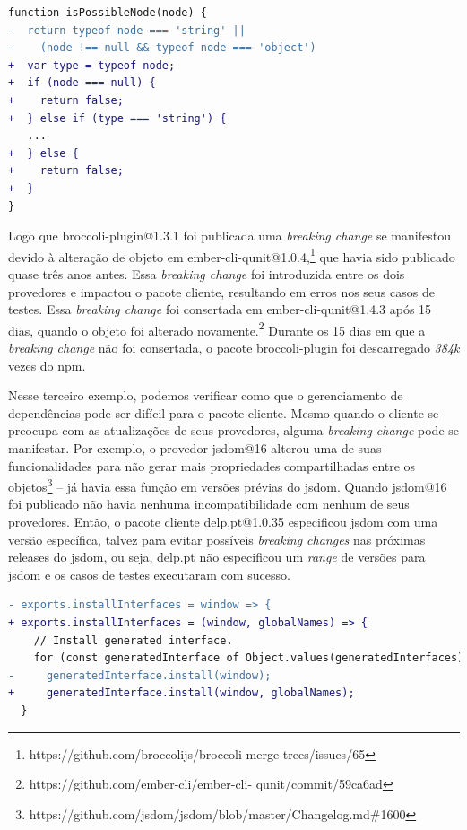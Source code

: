 \vspace{0.4cm}
\begin{lstlisting}[numbers=none, language=diff, label=cod:bc:ember_2, caption={broccoli-plugin@1.3.1 validation function enhanced.}]
 function isPossibleNode(node) {
-  return typeof node === 'string' ||
-    (node !== null && typeof node === 'object')
+  var type = typeof node;
+  if (node === null) {
+    return false;
+  } else if (type === 'string') {
   ...
+  } else {
+    return false;
+  }
}
\end{lstlisting}

Logo que \textsf{broccoli-plugin@1.3.1} foi publicada uma \textit{breaking change} se manifestou devido à alteração de objeto em \textsf{ember-cli-qunit@1.0.4},\footnote{https://github.com/broccolijs/broccoli-merge-trees/issues/65} que havia sido publicado quase três anos antes. Essa \textit{breaking change} foi introduzida entre os dois provedores e impactou o pacote cliente, resultando em erros nos seus casos de testes. Essa \textit{breaking change} foi consertada em \textsf{ember-cli-qunit@1.4.3} após 15 dias, quando o objeto foi alterado novamente.\footnote{https://github.com/ember-cli/ember-cli-
qunit/commit/59ca6ad} Durante os 15 dias em que a \textit{breaking change} não foi consertada, o pacote \textsf{broccoli-plugin} foi descarregado \textit{384k} vezes do \textsf{npm}.

Nesse terceiro exemplo, podemos verificar como que o gerenciamento de dependências pode ser difícil para o pacote cliente. Mesmo quando o cliente se preocupa com as atualizações de seus provedores, alguma \textit{breaking change} pode se manifestar. Por exemplo, o provedor \textsf{jsdom@16} alterou uma de suas funcionalidades para não gerar mais propriedades compartilhadas entre os objetos\footnote{https://github.com/jsdom/jsdom/blob/master/Changelog.md\#1600} -- já havia essa função em versões prévias do \textsf{jsdom}. Quando \textsf{jsdom@16} foi publicado não havia nenhuma incompatibilidade com nenhum de seus provedores. Então, o pacote cliente \textsf{delp.pt@1.0.35} especificou \textsf{jsdom} com uma versão específica, talvez para evitar possíveis \textit{breaking changes} nas próximas releases do \textsf{jsdom}, ou seja, \textsf{delp.pt} não especificou um \textit{range} de versões para \textsf{jsdom} e os casos de testes executaram com sucesso.

\vspace{0.4cm}
\begin{lstlisting}[numbers=none, language=diff, label=cod:bc:jsdom, caption={\textsf{jsdom@16.3} corrige a função \texttt{installInterface}}]
- exports.installInterfaces = window => {
+ exports.installInterfaces = (window, globalNames) => {
    // Install generated interface.
    for (const generatedInterface of Object.values(generatedInterfaces)) {
-     generatedInterface.install(window);
+     generatedInterface.install(window, globalNames);
  }
\end{lstlisting}

